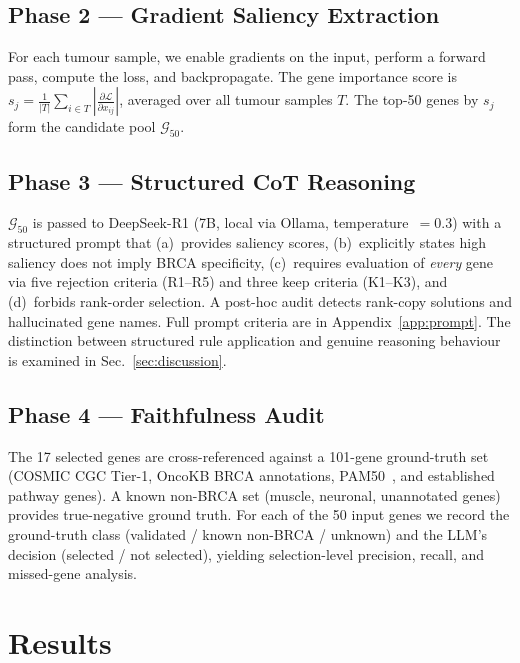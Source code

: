 \documentclass{article}
\begin{document}
\subsection{Phase 2 — Gradient Saliency Extraction}
For each tumour sample, we enable gradients on the input, perform a
forward pass, compute the loss, and backpropagate.
The gene importance score is $s_j = \frac{1}{|T|}\sum_{i \in T}
\left|\frac{\partial \mathcal{L}}{\partial x_{ij}}\right|$,
averaged over all tumour samples $T$.
The top-50 genes by $s_j$ form the candidate pool $\mathcal{G}_{50}$.

\subsection{Phase 3 — Structured CoT Reasoning}
$\mathcal{G}_{50}$ is passed to DeepSeek-R1 (7B, local via Ollama,
temperature~$=0.3$) with a structured prompt that (a)~provides saliency
scores, (b)~explicitly states high saliency does not imply BRCA
specificity, (c)~requires evaluation of \emph{every} gene via five
rejection criteria (R1--R5) and three keep criteria (K1--K3), and
(d)~forbids rank-order selection.
A post-hoc audit detects rank-copy solutions and hallucinated gene names.
Full prompt criteria are in Appendix~\ref{app:prompt}.
The distinction between structured rule application and genuine reasoning
behaviour is examined in Sec.~\ref{sec:discussion}.

\subsection{Phase 4 — Faithfulness Audit}
The 17 selected genes are cross-referenced against a 101-gene ground-truth
set (COSMIC CGC Tier-1, OncoKB BRCA annotations, PAM50~\citep{parker2009},
and established pathway genes).
A known non-BRCA set (muscle, neuronal, unannotated genes) provides
true-negative ground truth.
For each of the 50 input genes we record the ground-truth class
(validated / known non-BRCA / unknown) and the LLM's decision (selected /
not selected), yielding selection-level precision, recall, and
missed-gene analysis.

\section{Results}
\label{sec:results}
\end{document}

